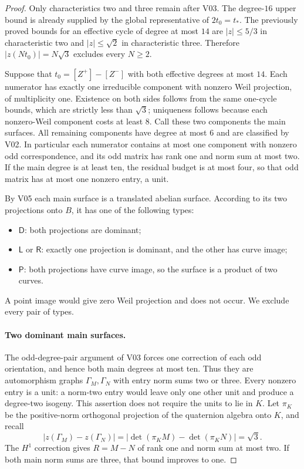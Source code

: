 \begin{proof}
Only characteristics two and three remain after V03. The degree-$16$
upper bound is already supplied by the global representative of
$2t_0=t_*$. The previously proved bounds for an effective cycle of degree
at most $14$ are $|z|\leq5/3$ in characteristic two and
$|z|\leq\sqrt2$ in characteristic three. Therefore
$|z(Nt_0)|=N\sqrt3$ excludes every $N\geq2$.

Suppose that $t_0=[Z^+]-[Z^-]$ with both effective degrees at most $14$.
Each numerator has exactly one irreducible component with nonzero Weil
projection, of multiplicity one. Existence on both sides follows from
the same one-cycle bounds, which are strictly less than $\sqrt3$;
uniqueness follows because each nonzero-Weil component costs at least
$8$. Call these two components the main surfaces. All remaining
components have degree at most $6$ and are classified by V02. In
particular each numerator contains at most one component with nonzero
odd correspondence, and its odd matrix has rank one and norm sum at
most two. If the main degree is at least ten, the residual budget is
at most four, so that odd matrix has at most one nonzero entry, a unit.

By V05 each main surface is a translated abelian surface. According to
its two projections onto $B$, it has one of the following types:
\begin{itemize}
\item $\mathsf D$: both projections are dominant;
\item $\mathsf L$ or $\mathsf R$: exactly one projection is dominant,
and the other has curve image;
\item $\mathsf P$: both projections have curve image, so the surface
is a product of two curves.
\end{itemize}
A point image would give zero Weil projection and does not occur.
We exclude every pair of types.

\paragraph{Two dominant main surfaces.}
The odd-degree-pair argument of V03 forces one correction of each odd
orientation, and hence both main degrees at most ten. Thus they are
automorphism graphs $\Gamma_M,\Gamma_N$ with entry norm sums two or
three. Every nonzero entry is a unit: a norm-two entry would leave only
one other unit and produce a degree-two isogeny. This assertion does
not require the units to lie in $K$. Let $\pi_K$ be the positive-norm
orthogonal projection of the quaternion algebra onto $K$, and recall
\[
 |z(\Gamma_M)-z(\Gamma_N)|
   =|\det(\pi_K M)-\det(\pi_K N)|=\sqrt3.
\]
The $H^1$ correction gives $R=M-N$ of rank one and norm sum at most
two. If both main norm sums are three, that bound improves to one.


\end{proof}
